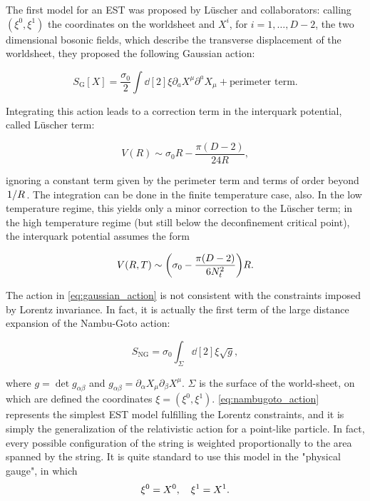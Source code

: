 \documentclass[reqno,12pt]{article}
\numberwithin{equation}{section}
\begin{document}
The first model for an EST was proposed by L{\"u}scher and collaborators: calling $(\xi^0, \xi^1)$ the coordinates
on the worldsheet and $X^i$, for $i = 1, \dots, D - 2$, the two dimensional bosonic fields, which describe the transverse
displacement of the worldsheet, they proposed the following Gaussian action:

\begin{equation} \label{eq:gaussian_action}
	S_\text{G}[X] = \frac{\sigma_0}{2} \int \dd[2]{\xi} \partial_a X^\mu \partial^a X_\mu + \text{perimeter term.}
\end{equation} 

Integrating this action leads to a correction term in the interquark potential, called L{\"u}scher term:

\begin{equation}
	V(R) \sim \sigma_0 R - \frac{\pi(D-2)}{24R},
\end{equation}

ignoring a constant term given by the perimeter term and terms of order beyond $\flatfrac{1}{R}$. The integration
can be done in the finite temperature case, also. In the low temperature regime, this yields only a minor correction
to the L{\"u}scher term; in the high temperature regime (but still below the deconfinement critical point), the interquark
potential assumes the form \cite{caselle}

\begin{equation}
	V(R, T) \sim \qty(\sigma_0 - \frac{\pi(D - 2)}{6N_t^2})R.
\end{equation}

The action in \eqref{eq:gaussian_action} is not consistent with the constraints imposed by Lorentz invariance. In fact,
it is actually the first term of the large distance expansion of the Nambu-Goto action:

\begin{equation} \label{eq:nambugoto_action}
	S_\text{NG} = \sigma_0 \int_\Sigma \dd[2]\xi \sqrt{g},
\end{equation}

where $g = \det g_{\alpha\beta}$ and $g_{\alpha\beta} = \partial_\alpha X_\mu \partial_\beta X^\mu$. $\Sigma$ is the surface of the
world-sheet, on which are defined the coordinates $\xi = (\xi^0, \xi^1)$. \eqref{eq:nambugoto_action} represents the 
simplest EST model fulfilling the Lorentz constraints, and it is simply the generalization of the relativistic
action for a point-like particle.
In fact, every possible configuration of the string is weighted proportionally to the area spanned by
the string. It is quite standard to use this model in the "physical gauge", in which 
\begin{equation}
	\xi^0 = X^0 \qc \xi^1 = X^1.
\end{equation} 
\end{document}
